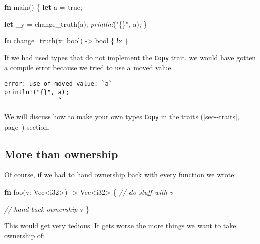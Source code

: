 \documentclass[a4paper,]{book}
\renewcommand*{\hyperlink}[2]{%
 #2 (\autoref{#1}, page~\pageref{#1})}
\newenvironment{Shaded}{\begin{snugshade}}{\end{snugshade}}
\newcommand{\KeywordTok}[1]{\textcolor[rgb]{0.13,0.29,0.53}{\textbf{{#1}}}}
\newcommand{\DataTypeTok}[1]{\textcolor[rgb]{0.13,0.29,0.53}{{#1}}}
\newcommand{\ConstantTok}[1]{\textcolor[rgb]{0.00,0.00,0.00}{{#1}}}
\newcommand{\StringTok}[1]{\textcolor[rgb]{0.31,0.60,0.02}{{#1}}}
\newcommand{\CommentTok}[1]{\textcolor[rgb]{0.56,0.35,0.01}{\textit{{#1}}}}
\newcommand{\PreprocessorTok}[1]{\textcolor[rgb]{0.56,0.35,0.01}{\textit{{#1}}}}
\newcommand{\NormalTok}[1]{{#1}}
\begin{document}
\begin{Shaded}
\begin{Highlighting}[]
\KeywordTok{fn} \NormalTok{main() \{}
    \KeywordTok{let} \NormalTok{a = }\ConstantTok{true}\NormalTok{;}

    \KeywordTok{let} \NormalTok{_y = change_truth(a);}
    \PreprocessorTok{println!}\NormalTok{(}\StringTok{"\{\}"}\NormalTok{, a);}
\NormalTok{\}}

\KeywordTok{fn} \NormalTok{change_truth(x: }\DataTypeTok{bool}\NormalTok{) -> }\DataTypeTok{bool} \NormalTok{\{}
    \NormalTok{!x}
\NormalTok{\}}
\end{Highlighting}
\end{Shaded}

If we had used types that do not implement the \texttt{Copy} trait, we
would have gotten a compile error because we tried to use a moved value.

\begin{verbatim}
error: use of moved value: `a`
println!("{}", a);
               ^
\end{verbatim}

We will discuss how to make your own types \texttt{Copy} in the
\protect\hyperlink{sec--traits}{traits} section.

\subsection{More than ownership}\label{more-than-ownership}

Of course, if we had to hand ownership back with every function we
wrote:

\begin{Shaded}
\begin{Highlighting}[]
\KeywordTok{fn} \NormalTok{foo(v: }\DataTypeTok{Vec}\NormalTok{<}\DataTypeTok{i32}\NormalTok{>) -> }\DataTypeTok{Vec}\NormalTok{<}\DataTypeTok{i32}\NormalTok{> \{}
    \CommentTok{// do stuff with v}

    \CommentTok{// hand back ownership}
    \NormalTok{v}
\NormalTok{\}}
\end{Highlighting}
\end{Shaded}

This would get very tedious. It gets worse the more things we want to
take ownership of:
\end{document}
